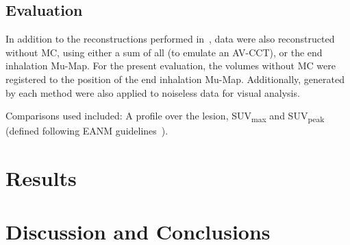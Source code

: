     
    \subsection{Evaluation} \label{sec:evaluation}
        In addition to the reconstructions performed in~, data were also reconstructed without \gls{MC}, using either a sum of all  (to emulate an \gls{AV-CCT}), or the end inhalation \gls{Mu-Map}. For the present evaluation, the volumes without \gls{MC} were registered to the position of the end inhalation \gls{Mu-Map}. Additionally,  generated by each method were also applied to noiseless data for visual analysis.
        
        Comparisons used included: A profile over the lesion, \gls{SUV}\textsubscript{max} and \gls{SUV}\textsubscript{peak} (defined following \gls{EANM} guidelines~\cite{Boellaard2015FDG2.0}).


\section{Results} \label{sec:results}
        
        
        
        
        
        
    
    


\section{Discussion and Conclusions} \label{sec:discussion_and_conclusions}
    
    
